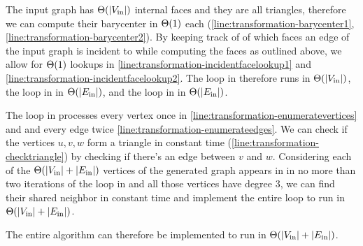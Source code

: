 The input graph has $\Theta(\left\lvert V_\text{in}\right\rvert)$ internal faces and they are all triangles, therefore we can compute their barycenter in $\Theta(1)$ each (\cref{line:transformation-barycenter1}, \cref{line:transformation-barycenter2}).
By keeping track of of which faces an edge of the input graph is incident to while computing the faces as outlined above, we allow for $\Theta(1)$ lookups in \cref{line:transformation-incidentfacelookup1} and \cref{line:transformation-incidentfacelookup2}.
The loop in  therefore runs in $\Theta(\left\lvert V_\text{in}\right\rvert)$, the loop in  in $\Theta(\left\lvert E_\text{in}\right\rvert)$, and the loop in  in $\Theta(\left\lvert E_\text{in}\right\rvert)$.

The loop in  processes every vertex once in \cref{line:transformation-enumeratevertices} and and every edge twice \cref{line:transformation-enumerateedges}.
We can check if the vertices $u,v,w$ form a triangle in constant time (\cref{line:transformation-checktriangle}) by checking if there's an edge between $v$ and $w$.
Considering each of the $\Theta(\left\lvert V_\text{in}\right\rvert + \left\lvert E_\text{in}\right\rvert)$ vertices of the generated graph appears in  in no more than two iterations of the loop in  and all those vertices have degree 3, we can find their shared neighbor in constant time and implement the entire loop to run in $\Theta(\left\lvert V_\text{in}\right\rvert + \left\lvert E_\text{in}\right\rvert)$.


The entire algorithm can therefore be implemented to run in $\Theta(\left\lvert V_\text{in}\right\rvert + \left\lvert E_\text{in}\right\rvert)$.
